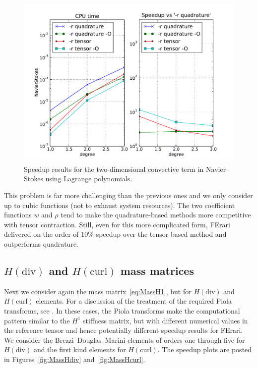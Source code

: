 \begin{figure}
  \begin{center}
    \includegraphics[width=12cm]{chapters/kirby-3/pdf/NavierStokes.pdf}
    \caption{Speedup results for the two-dimensional convective term
      in Navier--Stokes using Lagrange polynomials.}
    \label{fig:NavierStokes}
  \end{center}
\end{figure}

This problem is far more challenging than the previous ones and we
only consider up to cubic functions (not to exhaust system
resources). The two coefficient functions $ w $ and $ \rho $ tend to
make the quadrature-based methods more competitive with tensor
contraction.  Still, even for this more complicated form, FErari
delivered on the order of $ 10\% $ speedup over the tensor-based
method and outperforms quadrature.

\subsection{$H(\mathrm{div})$ and $H(\mathrm{curl})$ mass matrices}

Next we consider again the mass matrix~\eqref{eq:MassH1}, but for $
H(\mathrm{div})$ and $H(\mathrm{curl})$ elements. For a discussion of
the treatment of the required Piola transforms,
see \citet{RognesKirbyLogg2009}. In these cases, the Piola transforms
make the computational pattern similar to the $ H^1 $ stiffness
matrix, but with different numerical values in the reference tensor
and hence potentially different speedup results for FErari. We
consider the Brezzi--Douglas--Marini elements of orders one through
five for $H(\mathrm{div})$ and the first kind \nedelec{} elements
for $H(\mathrm{curl}) $. The speedup plots are posted in
Figures~\ref{fig:MassHdiv} and~\ref{fig:MassHcurl}.


